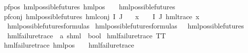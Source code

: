 \begin{isabellebody}
pf{\isacharunderscore}{\kern0pt}pos{\isacharcolon}{\kern0pt}\ {\isachardoublequoteopen}hml{\isacharunderscore}{\kern0pt}possible{\isacharunderscore}{\kern0pt}futures\ {\isacharparenleft}{\kern0pt}hml{\isacharunderscore}{\kern0pt}pos\ {\isasymalpha}\ {\isasymphi}{\isacharparenright}{\kern0pt}{\isachardoublequoteclose}\ \ {\isachardoublequoteopen}hml{\isacharunderscore}{\kern0pt}possible{\isacharunderscore}{\kern0pt}futures\ {\isasymphi}{\isachardoublequoteclose}\ {\isacharbar}{\kern0pt}\isanewline
pf{\isacharunderscore}{\kern0pt}conj{\isacharcolon}{\kern0pt}\ {\isachardoublequoteopen}hml{\isacharunderscore}{\kern0pt}possible{\isacharunderscore}{\kern0pt}futures\ {\isacharparenleft}{\kern0pt}hml{\isacharunderscore}{\kern0pt}conj\ I\ J\ {\isasymPhi}{\isacharparenright}{\kern0pt}{\isachardoublequoteclose}\ \isanewline
{}\ {\isachardoublequoteopen}{\isasymforall}x\ {\isasymin}\ {\isacharparenleft}{\kern0pt}{\isasymPhi}\ {\isacharbackquote}{\kern0pt}\ {\isacharparenleft}{\kern0pt}I{\isasymunion}\ J{\isacharparenright}{\kern0pt}{\isacharparenright}{\kern0pt}{\isachardot}{\kern0pt}\ {\isacharparenleft}{\kern0pt}hml{\isacharunderscore}{\kern0pt}trace\ x{\isacharparenright}{\kern0pt}{\isachardoublequoteclose}\isanewline
\isanewline
{}\isamarkupfalse%
\ hml{\isacharunderscore}{\kern0pt}possible{\isacharunderscore}{\kern0pt}futures{\isacharunderscore}{\kern0pt}formulas\ \isanewline
{\isachardoublequoteopen}hml{\isacharunderscore}{\kern0pt}possible{\isacharunderscore}{\kern0pt}futures{\isacharunderscore}{\kern0pt}formulas\ {\isasymequiv}\ {\isacharbraceleft}{\kern0pt}{\isasymphi}{\isachardot}{\kern0pt}\ hml{\isacharunderscore}{\kern0pt}possible{\isacharunderscore}{\kern0pt}futures\ {\isasymphi}{\isacharbraceright}{\kern0pt}{\isachardoublequoteclose}\isanewline
\isanewline
{}\isamarkupfalse%
\ hml{\isacharunderscore}{\kern0pt}failure{\isacharunderscore}{\kern0pt}trace\ {\isacharcolon}{\kern0pt}{\isacharcolon}{\kern0pt}\ {\isachardoublequoteopen}{\isacharparenleft}{\kern0pt}{\isacharprime}{\kern0pt}a{\isacharcomma}{\kern0pt}\ {\isacharprime}{\kern0pt}s{\isacharparenright}{\kern0pt}hml\ {\isasymRightarrow}\ bool{\isachardoublequoteclose}\ \isanewline
{\isachardoublequoteopen}hml{\isacharunderscore}{\kern0pt}failure{\isacharunderscore}{\kern0pt}trace\ TT{\isachardoublequoteclose}\ {\isacharbar}{\kern0pt}\isanewline
{\isachardoublequoteopen}hml{\isacharunderscore}{\kern0pt}failure{\isacharunderscore}{\kern0pt}trace\ {\isacharparenleft}{\kern0pt}hml{\isacharunderscore}{\kern0pt}pos\ {\isasymalpha}\ {\isasymphi}{\isacharparenright}{\kern0pt}{\isachardoublequoteclose}\ \ {\isachardoublequoteopen}hml{\isacharunderscore}{\kern0pt}failure{\isacharunderscore}{\kern0pt}trace\ {\isasymphi}{\isachardoublequoteclose}\ {\isacharbar}{\kern0pt}\isanewline

\end{isabellebody}
